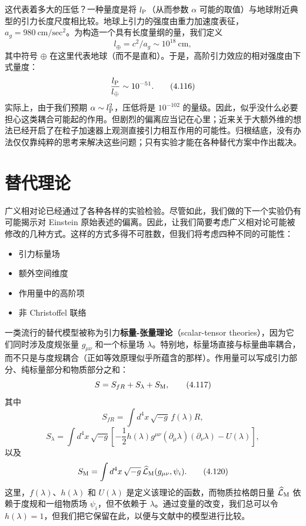 这代表着多大的压低？一种量度是将 $l_{\rm P}$（从而参数 $\alpha$ 可能的取值）与地球附近典型的引力长度尺度相比较。地球上引力的强度由重力加速度表征，$a_g = 980\ \mathrm{cm/sec^2}$。为构造一个具有长度量纲的量，我们定义
\begin{equation*}
l_\oplus = c^2/a_g \sim 10^{18}\ \mathrm{cm},
\tag{4.115}
\end{equation*}
其中符号 $\oplus$ 在这里代表地球（而不是直和）。于是，高阶引力效应的相对强度由下式量度：
\begin{equation*}
\frac{l_{\rm P}}{l_\oplus} \sim 10^{-51}.
\tag{4.116}
\end{equation*}
实际上，由于我们预期 $\alpha \sim l_{\rm P}^2$，压低将是 $10^{-102}$ 的量级。因此，似乎没什么必要担心这类耦合可能起的作用。但剧烈的偏离应当记在心里；近来关于大额外维的想法已经开启了在粒子加速器上观测直接引力相互作用的可能性。归根结底，没有办法仅仅靠纯粹的思考来解决这些问题；只有实验才能在各种替代方案中作出裁决。

\section{替代理论}

广义相对论已经通过了各种各样的实验检验。尽管如此，我们做的下一个实验仍有可能揭示对 Einstein 原始表述的偏离。因此，让我们简要考虑广义相对论可能被修改的几种方式。这样的方式多得不可胜数，但我们将考虑四种不同的可能性：
\begin{itemize}
\item 引力标量场
\item 额外空间维度
\item 作用量中的高阶项
\item 非 Christoffel 联络
\end{itemize}

一类流行的替代模型被称为引力\textbf{标量-张量理论}（scalar-tensor theories），因为它们同时涉及度规张量 $g_{\mu\nu}$ 和一个标量场 $\lambda$。特别地，标量场直接与标量曲率耦合，而不只是与度规耦合（正如等效原理似乎所蕴含的那样）。作用量可以写成引力部分、纯标量部分和物质部分之和：
\begin{equation*}
S = S_{fR} + S_\lambda + S_{\rm M},
\tag{4.117}
\end{equation*}
其中
\begin{equation*}
S_{fR} = \int d^4x\,\sqrt{-g}\, f(\lambda)R,
\tag{4.118}
\end{equation*}
\begin{equation*}
S_\lambda = \int d^4x\,\sqrt{-g}\left[-\frac{1}{2}h(\lambda)g^{\mu\nu}(\partial_\mu\lambda)(\partial_\nu\lambda) - U(\lambda)\right],
\tag{4.119}
\end{equation*}
以及
\begin{equation*}
S_{\rm M} = \int d^4x\,\sqrt{-g}\,\widehat{\mathcal{L}}_{\rm M}(g_{\mu\nu}, \psi_i).
\tag{4.120}
\end{equation*}
这里，$f(\lambda)$、$h(\lambda)$ 和 $U(\lambda)$ 是定义该理论的函数，而物质拉格朗日量 $\widehat{\mathcal{L}}_{\rm M}$ 依赖于度规和一组物质场 $\psi_i$，但不依赖于 $\lambda$。通过变量的改变，我们总可以令 $h(\lambda) = 1$，但我们把它保留在此，以便与文献中的模型进行比较。

